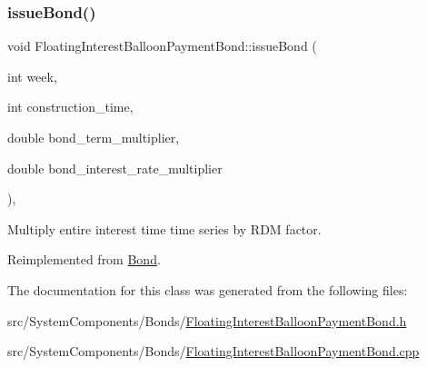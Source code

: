 \subsubsection{\texorpdfstring{issue\+Bond()}{issueBond()}}
{\footnotesize\ttfamily void Floating\+Interest\+Balloon\+Payment\+Bond\+::issue\+Bond (\begin{DoxyParamCaption}\item[{int}]{week,  }\item[{int}]{construction\+\_\+time,  }\item[{double}]{bond\+\_\+term\+\_\+multiplier,  }\item[{double}]{bond\+\_\+interest\+\_\+rate\+\_\+multiplier }\end{DoxyParamCaption})\hspace{0.3cm}{\ttfamily [override]}, {\ttfamily [virtual]}}

Multiply entire interest time time series by R\+DM factor. 

Reimplemented from \mbox{\hyperlink{classBond_a377db8c18b83c4666e46686bc26adef1}{Bond}}.



The documentation for this class was generated from the following files\+:\begin{DoxyCompactItemize}
\item 
src/\+System\+Components/\+Bonds/\mbox{\hyperlink{FloatingInterestBalloonPaymentBond_8h}{Floating\+Interest\+Balloon\+Payment\+Bond.\+h}}\item 
src/\+System\+Components/\+Bonds/\mbox{\hyperlink{FloatingInterestBalloonPaymentBond_8cpp}{Floating\+Interest\+Balloon\+Payment\+Bond.\+cpp}}\end{DoxyCompactItemize}
